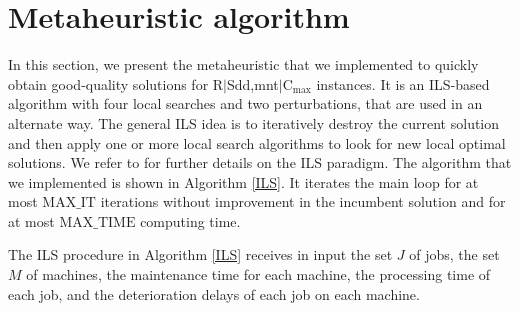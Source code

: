 \documentclass[a4paper,11pt]{article}
\begin{document}
\section{Metaheuristic algorithm} \label{sec:heuristic}%
%
In this section, we present the metaheuristic that we implemented to quickly obtain good-quality solutions for R$|$Sdd,mnt$|$C$_{\max}$ instances. It is an ILS-based algorithm with four local searches and two perturbations, that are used in an alternate way. The general ILS idea is to iteratively destroy the current solution and then apply one or more local search algorithms to look for new local optimal solutions. We refer to \cite{Lourenco2010} for further details on the ILS paradigm. The algorithm that we implemented is shown in Algorithm \ref{ILS}. It iterates the main loop for at most $\text{MAX}\_\text{IT}$ iterations without improvement in the incumbent solution and for at most $\text{MAX}\_\text{TIME}$ computing time. 

The ILS procedure in Algorithm \ref{ILS} receives in input the set $J$ of jobs, the set $M$ of machines, the maintenance time for each machine, the processing time of each job, and the deterioration delays of each job on each machine. 
\end{document}
